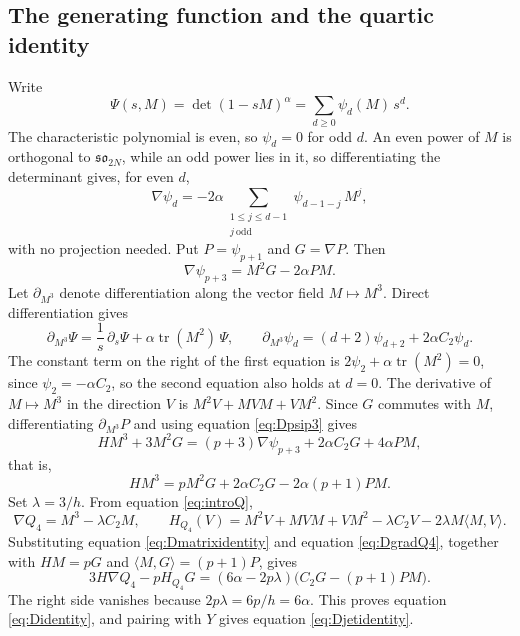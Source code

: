 \documentclass[10pt,reqno]{amsart}
\numberwithin{equation}{section}
\theoremstyle{plain}
\theoremstyle{definition}
\DeclareMathOperator{\tr}{tr}
\newcommand{\ip}[2]{\langle #1, #2\rangle}
\begin{document}
\subsection{The generating function and the quartic identity}

Write
\begin{equation*}
	\Psi(s,M)=\det(1-sM)^\alpha=\sum_{d\ge0}\psi_d(M)\,s^d .
\end{equation*}
The characteristic polynomial is even, so $\psi_d=0$ for odd $d$. An even power of $M$ is orthogonal to $\mathfrak{so}_{2N}$, while an odd power lies in it, so differentiating the determinant gives, for even $d$,
\begin{equation}\label{eq:Dgradpsi}
	\nabla\psi_d=-2\alpha\sum_{\substack{1\le j\le d-1\\ j\ \mathrm{odd}}}\psi_{d-1-j}\,M^j,
\end{equation}
with no projection needed. Put $P=\psi_{p+1}$ and $G=\nabla P$. Then
\begin{equation}\label{eq:Dpsip3}
	\nabla\psi_{p+3}=M^2G-2\alpha PM .
\end{equation}
Let $\partial_{M^3}$ denote differentiation along the vector field $M\mapsto M^3$. Direct differentiation gives
\begin{equation*}
	\partial_{M^3}\Psi=\frac1s\,\partial_s\Psi+\alpha\tr(M^2)\,\Psi,\qquad \partial_{M^3}\psi_d=(d+2)\psi_{d+2}+2\alpha C_2\psi_d .
\end{equation*}
The constant term on the right of the first equation is $2\psi_2+\alpha\tr(M^2)=0$, since $\psi_2=-\alpha C_2$, so the second equation also holds at $d=0$. The derivative of $M\mapsto M^3$ in the direction $V$ is $M^2V+MVM+VM^2$. Since $G$ commutes with $M$, differentiating $\partial_{M^3}P$ and using equation \eqref{eq:Dpsip3} gives
\begin{equation*}
	H M^3+3M^2G=(p+3)\nabla\psi_{p+3}+2\alpha C_2G+4\alpha PM,
\end{equation*}
that is,
\begin{equation}\label{eq:Dmatrixidentity}
	HM^3=pM^2G+2\alpha C_2G-2\alpha(p+1)PM .
\end{equation}
Set $\lambda=3/h$. From equation \eqref{eq:introQ},
\begin{equation}\label{eq:DgradQ4}
	\nabla Q_4=M^3-\lambda C_2M,\qquad H_{Q_4}(V)=M^2V+MVM+VM^2-\lambda C_2V-2\lambda M\ip MV.
\end{equation}
Substituting equation \eqref{eq:Dmatrixidentity} and equation \eqref{eq:DgradQ4}, together with $HM=pG$ and $\ip MG=(p+1)P$, gives
\begin{equation}\label{eq:Dforced}
	3H\nabla Q_4-pH_{Q_4}G=(6\alpha-2p\lambda)\big(C_2G-(p+1)PM\big).
\end{equation}
The right side vanishes because $2p\lambda=6p/h=6\alpha$. This proves equation \eqref{eq:Didentity}, and pairing with $Y$ gives equation \eqref{eq:Djetidentity}.
\end{document}
